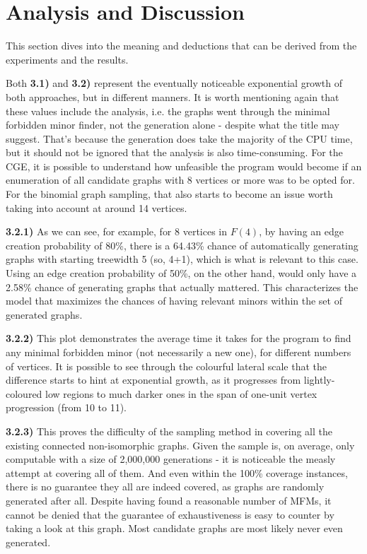 \section{Analysis and Discussion}
This section dives into the meaning and deductions that can be derived from the experiments and the results.

Both \textbf{3.1)} and \textbf{3.2) }represent the eventually noticeable exponential growth of both approaches, but in different manners. It is worth mentioning again that these values include the analysis, i.e. the graphs went through the minimal forbidden minor finder, not the generation alone - despite what the title may suggest. That's because the generation does take the majority of the CPU time, but it should not be ignored that the analysis is also time-consuming.  For the CGE, it is possible to understand how unfeasible the program would become if an enumeration of all candidate graphs with 8 vertices or more was to be opted for. For the binomial graph sampling, that also starts to become an issue worth taking into account at around 14 vertices. 

\textbf{3.2.1)} As we can see, for example, for 8 vertices in $F(4)$, by having an edge creation probability of 80\%, there is a 64.43\% chance of automatically generating graphs with starting treewidth 5 (so, 4+1), which is what is relevant to this case. Using an edge creation probability of 50\%, on the other hand, would only have a 2.58\% chance of generating graphs that actually mattered. This characterizes the model that maximizes the chances of having relevant minors within the set of generated graphs.

\textbf{3.2.2)} This plot demonstrates the average time it takes for the program to find any minimal forbidden minor (not necessarily a new one), for different numbers of vertices. It is possible to see through the colourful lateral scale that the difference starts to hint at exponential growth, as it progresses from lightly-coloured low regions to much darker ones in the span of one-unit vertex progression (from 10 to 11).

\textbf{3.2.3)} This proves the difficulty of the sampling method in covering all the existing connected non-isomorphic graphs. Given the sample is, on average, only computable with a size of 2,000,000 generations - it is noticeable the measly attempt at covering all of them. And even within the 100\% coverage instances, there is no guarantee they all are indeed covered, as graphs are randomly generated after all. Despite having found a reasonable number of MFMs, it cannot be denied that the guarantee of exhaustiveness is easy to counter by taking a look at this graph. Most candidate graphs are most likely never even generated.

